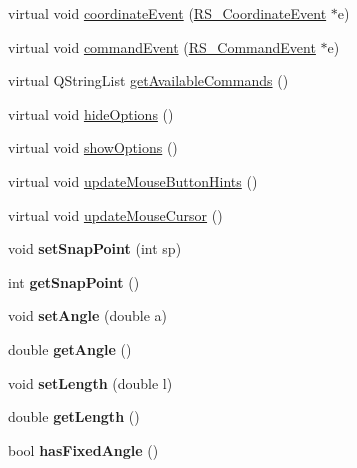 \begin{DoxyCompactItemize}
\item 
virtual void \hyperlink{classRS__ActionDrawLineAngle_aca3d88ad3c0763b47cc5e0a046687fa3}{coordinate\-Event} (\hyperlink{classRS__CoordinateEvent}{R\-S\-\_\-\-Coordinate\-Event} $\ast$e)
\item 
virtual void \hyperlink{classRS__ActionDrawLineAngle_a58b122116d96df3ad717568bdf15094d}{command\-Event} (\hyperlink{classRS__CommandEvent}{R\-S\-\_\-\-Command\-Event} $\ast$e)
\item 
virtual Q\-String\-List \hyperlink{classRS__ActionDrawLineAngle_ad75d1ac973fb22f9f824fcc080bbd62b}{get\-Available\-Commands} ()
\item 
virtual void \hyperlink{classRS__ActionDrawLineAngle_a13ca8c59398e43aaf03563052d830860}{hide\-Options} ()
\item 
virtual void \hyperlink{classRS__ActionDrawLineAngle_a8c93a374583dd7c49600bb40b1d65ec4}{show\-Options} ()
\item 
virtual void \hyperlink{classRS__ActionDrawLineAngle_a62d41faab77e27e9e01cea449e5f8b89}{update\-Mouse\-Button\-Hints} ()
\item 
virtual void \hyperlink{classRS__ActionDrawLineAngle_a12811bbee32329d74e143fc92aa07dfb}{update\-Mouse\-Cursor} ()
\item 
\hypertarget{classRS__ActionDrawLineAngle_add144c0d56309cd10a425bb4fda3bbd1}{void {\bfseries set\-Snap\-Point} (int sp)}\label{classRS__ActionDrawLineAngle_add144c0d56309cd10a425bb4fda3bbd1}

\item 
\hypertarget{classRS__ActionDrawLineAngle_ae5d0beac82fdac81cebb9ca19fedd8f4}{int {\bfseries get\-Snap\-Point} ()}\label{classRS__ActionDrawLineAngle_ae5d0beac82fdac81cebb9ca19fedd8f4}

\item 
\hypertarget{classRS__ActionDrawLineAngle_a6569cf56045679cc12999d743f675182}{void {\bfseries set\-Angle} (double a)}\label{classRS__ActionDrawLineAngle_a6569cf56045679cc12999d743f675182}

\item 
\hypertarget{classRS__ActionDrawLineAngle_aa803b347fb9cd1f6d64be54524d0afe3}{double {\bfseries get\-Angle} ()}\label{classRS__ActionDrawLineAngle_aa803b347fb9cd1f6d64be54524d0afe3}

\item 
\hypertarget{classRS__ActionDrawLineAngle_a3eec8c75b73978e1ffc49f345d56c568}{void {\bfseries set\-Length} (double l)}\label{classRS__ActionDrawLineAngle_a3eec8c75b73978e1ffc49f345d56c568}

\item 
\hypertarget{classRS__ActionDrawLineAngle_aaf69cd9605fe897b5920b4b66ec227a3}{double {\bfseries get\-Length} ()}\label{classRS__ActionDrawLineAngle_aaf69cd9605fe897b5920b4b66ec227a3}

\item 
\hypertarget{classRS__ActionDrawLineAngle_a29060b5a2a28fe00ae00d36aecf9ede0}{bool {\bfseries has\-Fixed\-Angle} ()}\label{classRS__ActionDrawLineAngle_a29060b5a2a28fe00ae00d36aecf9ede0}

\end{DoxyCompactItemize}
